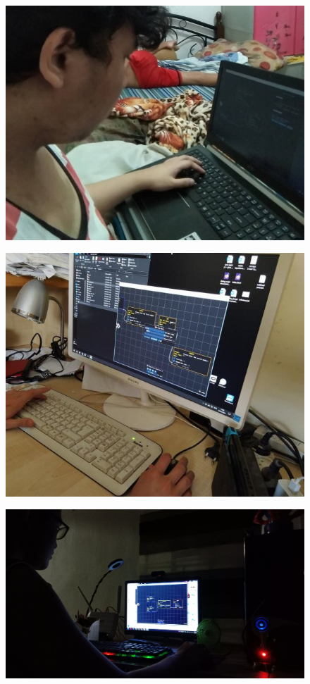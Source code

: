 \clearpage
\begin{figure}[H]
	 \centering
	 \includegraphics[width=\textwidth]{evaluators/non_tech/f_ec.jpg}
\end{figure}
\begin{figure}[H]
	 \centering
	 \includegraphics[width=\textwidth]{evaluators/non_tech/d_sr.jpg}
\end{figure}
\begin{figure}[H]
	 \centering
	 \includegraphics[width=\textwidth]{evaluators/non_tech/f_am.jpg}
\end{figure}
